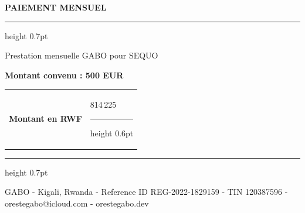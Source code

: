 \documentclass[11pt,a4paper]{article}
\makeatletter
\newcommand{\montantRwf}{814\,225}
\newcommand{\sectionTitle}[1]{%
  \vspace{0.85cm}
  {\large\bfseries\color{GaboOlive}#1}\par
  \vspace{0.12cm}
  {\color{GaboLine}\hrule height 0.7pt}
  \vspace{0.55cm}
}
\newcommand{\fieldValue}[2]{%
  \begin{tabularx}{\linewidth}{@{}p{3.6cm}X@{}}
    {\color{GaboMuted}\bfseries #1} &
    {\color{GaboInk}#2}\par
    {\color{GaboLine}\hrule height 0.6pt}
  \end{tabularx}
}
\makeatother
\begin{document}
\sectionTitle{PAIEMENT MENSUEL}
\noindent
Prestation mensuelle GABO pour SEQUO\par
\vspace{0.38cm}
\noindent
\begin{minipage}[t]{0.45\textwidth}
  {\large\bfseries\color{GaboGreen}Montant convenu : 500 EUR}
\end{minipage}
\hfill
\begin{minipage}[t]{0.48\textwidth}
  \fieldValue{Montant en RWF}{\montantRwf}
\end{minipage}

\vfill
{\color{GaboLine}\hrule height 0.7pt}
\vspace{0.25cm}
{\small\color{GaboMuted}GABO - Kigali, Rwanda - Reference ID REG-2022-1829159 - TIN 120387596 - orestegabo@icloud.com - orestegabo.dev}
\end{document}
